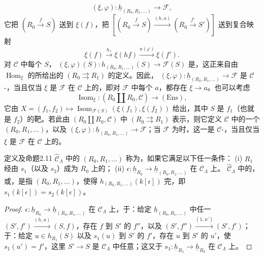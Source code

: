 \[(\xi,\varphi):\underline h_{(R_0,R_1,\ldots)}\longrightarrow\mathcal F,\]
它把 $(R_0\xrightarrow fS)$ 送到 $\xi(f)$，把
$[(R_0\xrightarrow fS)\xrightarrow{(h,u)}(R_0\xrightarrow{f'}S')]$ 送到复合映射
\[\xi(f)\xrightarrow{h_*}\xi(hf)\xrightarrow{u(\varphi)}\xi(f').\]
对 $\mathcal C$ 中每个 $S$，
$(\xi,\varphi)(S):h_{(R_0,R_1,\ldots)}(S)\to\mathcal F(S)$ 是，这正来自由 $\operatorname{Hom}_\xi$ 的所给出的 $(R_0\rightrightarrows R_1)$ 的定义。因此， $(\xi,\varphi):\underline h_{(R_0,R_1,\ldots)}\to\mathcal F$ 是 $\mathcal C$-，当且仅当 $\xi$ 是 $\mathcal F$ 在 $\mathcal C$ 上的，即对 $\mathcal F$ 中每个 $a$，都存在 $\xi\to a$。也可以考虑
\[\operatorname{Isom}_\xi:(R_0\amalg R_0,\mathcal C)\longrightarrow(\mathrm{Ens}),\]
它由 $X=(f_1,f_2)\mapsto\operatorname{Isom}_{\mathcal F(S)}(\xi(f_1),\xi(f_2))$ 给出，其中 $S$ 是 $f_1$（也就是 $f_2$）的靶。若此由 $(R_0\amalg R_0,\mathcal C)$ 中 $(R_0\rightrightarrows R_1)$ 表示，则它定义 $\mathcal C$ 中的一个 $(R_0,R_1,\ldots)$，以及 $(\xi,\varphi):\underline h_{(R_0,R_1,\ldots)}\to\mathcal F$；当 $\mathcal F$ 为时，这一是 $\mathcal C$-，当且仅当 $\xi$ 是 $\mathcal F$ 在 $\mathcal C$ 上的。
\begin{SGAresult}{定义及命题}{2.11}
$\widehat{\mathcal C}_\Lambda$ 中的 $(R_0,R_1,\ldots)$ 称为，如果它满足以下任一条件：
(i) $R_1$ 经由 $s_1$（以及 $s_2$）成为 $R_0$ 上的；
(ii) $\epsilon:\underline h_{R_0}\to\underline h_{(R_0,R_1,\ldots)}$ 在 $\mathcal C_\Lambda$ 上。
$\widehat{\mathcal C}_\Lambda$ 中的，或，是指 $(R_0,R_1,\ldots)$，使得 $h_{(R_0,R_1,\ldots)}(k[\epsilon])$ 完，即 $s_1(k[\epsilon])=s_2(k[\epsilon])$。
\end{SGAresult}
\begin{proof}
$\epsilon:\underline h_{R_0}\to\underline h_{(R_0,R_1,\ldots)}$ 在 $\mathcal C_\Lambda$ 上，于：给定 $\underline h_{(R_0,R_1,\ldots)}$ 中任一
$(S',f')\xrightarrow{(h,u)}(S,f)$，存在 $f$ 到 $S'$ 的 $f''$，以及 $(S',f'')\xrightarrow{(1,u')}(S',f')$；于：给定 $u\in h_{R_1}(S)$ 以及 $s_1(u)$ 到 $S'$ 的 $f'$，存在 $u$ 到 $S'$ 的 $u'$，使 $s_1(u')=f'$，这里 $S'\to S$ 是 $\mathcal C_\Lambda$ 中任意；这又于 $s_1:\underline h_{R_1}\to\underline h_{R_0}$ 在 $\mathcal C_\Lambda$ 上。
\end{proof}
